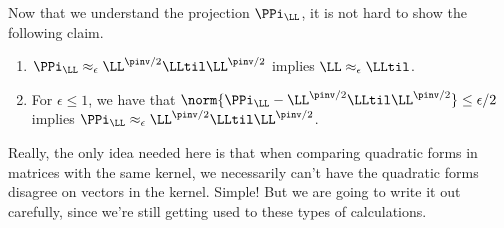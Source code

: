 Now that we understand the projection $\PPi_{\LL}$, it is not hard to
show the following claim.
\begin{claim}
  \label{clm:spectralreltoabs}
  \noindent
\begin{enumerate}
\item
\label{enu:switchapxnormalizer}
  $\PPi_{\LL} \approx_{\epsilon} \LL^{\pinv/2}\LLtil\LL^{\pinv/2}$
  implies $\LL \approx_{\epsilon} \LLtil$.
\item
  \label{enu:normtoapx}
  For $\epsilon \leq 1$, we have that
  $\norm{\PPi_{\LL} - \LL^{\pinv/2}\LLtil\LL^{\pinv/2}} \leq
  \epsilon/2$ implies  $\PPi_{\LL} \approx_{\epsilon} \LL^{\pinv/2}\LLtil\LL^{\pinv/2}$.
\end{enumerate}
\end{claim}
Really, the only idea needed here is that when comparing quadratic
forms in matrices with
the same kernel, we necessarily can't have the quadratic forms
disagree on vectors in the kernel.
Simple! But we are going to write it out carefully, since we're still
getting used to these types of calculations.
